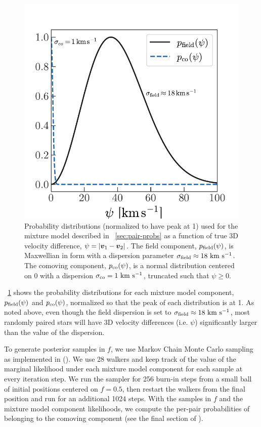 \documentclass[modern, letterpaper]{aastex61}
\begin{document}
\begin{figure}[htb]
  \begin{center}
    \includegraphics[width=0.75\linewidth]{mixture-model-demo.pdf}
  \end{center}
  \caption{%
    Probability distributions (normalized to have peak at 1) used for the
    mixture model described in \sectionname~\ref{sec:pair-probs} as a function
    of true 3D velocity difference, $\psi = \left| \boldsymbol{v}_1 - \boldsymbol{v}_2 \right|$.
    The field component, $p_{\rm field}(\psi)$, is Maxwellian in form with a
    dispersion parameter $\sigma_{\rm field} \approx 18~\mathrm{km}~\mathrm{s}^{-1}$.
    The comoving component, $p_{\rm co}(\psi)$, is a normal distribution
    centered on 0 with a dispersion $\sigma_{\rm co} = 1~\mathrm{km}~\mathrm{s}^{-1}$, truncated such
    that $\psi \geq 0$.
    \label{fig:mixture-model-demo}}
\end{figure}

\figurename~\ref{fig:mixture-model-demo} shows the probability distributions for
each mixture model component, $p_{\rm field}(\psi)$ and $p_{\rm co}(\psi)$,
normalized so that the peak of each distribution is at 1.
As noted above, even though the field dispersion is set to $\sigma_{\rm field}
\approx 18~\mathrm{km}~\mathrm{s}^{-1}$, most randomly paired stars will have 3D velocity differences
(i.e. $\psi$) significantly larger than the value of the dispersion.

To generate posterior samples in $f$, we use Markov Chain Monte Carlo sampling
as implemented in  (\citealt{Foreman-Mackey:2013}).
We use 28 walkers and keep track of the value of the marginal likelihood under
each mixture model component for each sample at every iteration step.
We run the sampler for 256 burn-in steps from a small ball of initial positions
centered on $f=0.5$, then restart the walkers from the final position and run
for an additional 1024 steps.
With the samples in $f$ and the mixture model component likelihoods, we compute
the per-pair probabilities of belonging to the comoving component (see the final
section of \citealt{Foreman-Mackey:2014}).
\end{document}
